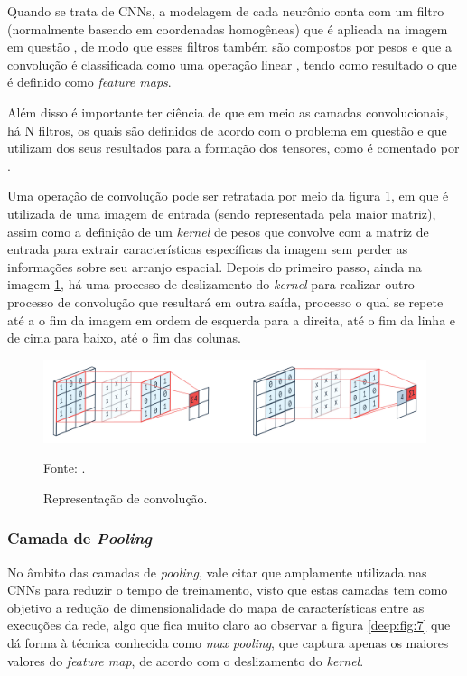 Quando se trata de CNNs, a modelagem de cada neurônio conta com um filtro (normalmente baseado em coordenadas homogêneas) que é aplicada na imagem em questão \cite{ponti2018funciona}, de modo que esses filtros também são compostos por pesos e que a convolução é classificada como uma operação linear \cite{Goodfellow2016}, tendo como resultado o que é definido como \textit{feature maps}.

Além disso é importante ter ciência de que em meio as camadas convolucionais, há N filtros, os quais são definidos de acordo com o problema em questão e que utilizam dos seus resultados para a formação dos tensores, como é comentado por \cite{ponti2018funciona}.

Uma operação de convolução pode ser retratada por meio da figura \ref{deep:fig:6}, em que é  utilizada de uma imagem de entrada (sendo representada pela maior matriz), assim como a definição de um \textit{kernel} de pesos que convolve com a matriz de entrada para extrair características específicas da imagem sem perder as informações sobre seu arranjo espacial.
Depois do primeiro passo, ainda na imagem \ref{deep:fig:6}, há uma processo de deslizamento do \textit{kernel} para realizar outro processo de convolução que resultará em outra saída, processo o qual se repete até a o fim da imagem em ordem de esquerda para a direita, até o fim da linha e de cima para baixo, até o fim das colunas.

\begin{figure}[H]
    \centering
    \caption{Representação de convolução.}
    \includegraphics[width=1\linewidth]{recursos/imagens/deep/2d_convolution.png}
    \label{deep:fig:6}
    
    \vspace*{1 cm}
    Fonte: \cite{PeltarionAI}.
\end{figure}


\subsubsection{Camada de \textit{Pooling}}
\label{deep:pooling}

No âmbito das camadas de \textit{pooling}, vale citar que amplamente utilizada nas CNNs para reduzir o tempo de treinamento, visto que estas camadas tem como objetivo a redução de dimensionalidade do mapa de características entre as execuções da rede, algo que fica muito claro ao observar a figura \ref{deep:fig:7} que dá forma à técnica conhecida como \textit{max pooling}, que captura apenas os maiores valores do \textit{feature map}, de acordo com o deslizamento do \textit{kernel}.

